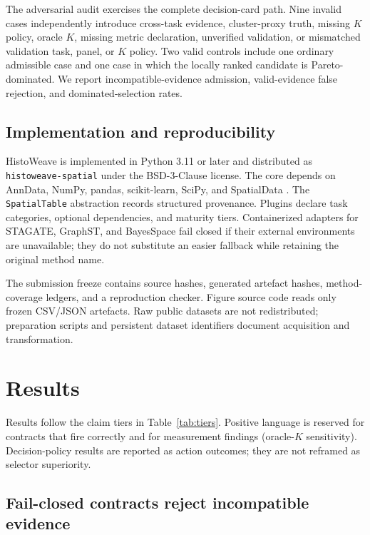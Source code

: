 \documentclass[12pt]{article}
\newcommand{\software}{HistoWeave}
\begin{document}
The adversarial audit exercises the complete decision-card path. Nine invalid
cases independently introduce cross-task evidence, cluster-proxy truth,
missing \(K\) policy, oracle \(K\), missing metric declaration, unverified
validation, or mismatched validation task, panel, or \(K\) policy. Two valid
controls include one ordinary admissible case and one case in which the
locally ranked candidate is Pareto-dominated. We report incompatible-evidence
admission, valid-evidence false rejection, and dominated-selection rates.

\subsection{Implementation and reproducibility}

\software{} is implemented in Python 3.11 or later and distributed as
\texttt{histoweave-spatial} under the BSD-3-Clause license. The core depends
on AnnData, NumPy, pandas, scikit-learn, SciPy, and SpatialData
\citep{pedregosa2011,marconato2025}. The \texttt{SpatialTable} abstraction
records structured provenance. Plugins declare task categories, optional
dependencies, and maturity tiers. Containerized adapters for STAGATE,
GraphST, and BayesSpace fail closed if their external environments are
unavailable; they do not substitute an easier fallback while retaining the
original method name.

The submission freeze contains source hashes, generated artefact hashes,
method-coverage ledgers, and a reproduction checker. Figure source code reads
only frozen CSV/JSON artefacts. Raw public datasets are not redistributed;
preparation scripts and persistent dataset identifiers document acquisition
and transformation.

\section{Results}

Results follow the claim tiers in Table~\ref{tab:tiers}. Positive language is
reserved for contracts that fire correctly and for measurement findings
(oracle-\(K\) sensitivity). Decision-policy results are reported as action
outcomes; they are not reframed as selector superiority.

\subsection{Fail-closed contracts reject incompatible evidence}
\end{document}

